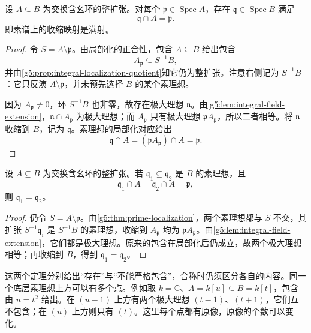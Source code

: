 \begin{theorem}
\label{g5:thm:lying-over}
	设 \(A\subseteq B\) 为交换含幺环的整扩张。对每个 \(\mathfrak p\in\operatorname{Spec}A\)，存在 \(\mathfrak q\in\operatorname{Spec}B\) 满足
	\[
		\mathfrak q\cap A=\mathfrak p.
	\]
	即素谱上的收缩映射是满射。
\end{theorem}
\begin{proof}
	令 \(S=A\setminus\mathfrak p\)。由局部化的正合性，包含 \(A\subseteq B\) 给出包含
	\[
		A_{\mathfrak p}\subseteq S^{-1}B,
	\]
	并由\cref{g5:prop:integral-localization-quotient}知它仍为整扩张。注意右侧记为 \(S^{-1}B\)：它只反演 \(A\setminus\mathfrak p\)，并未预先选择 \(B\) 的某个素理想。

	因为 \(A_{\mathfrak p}\ne0\)，环 \(S^{-1}B\) 也非零，故存在极大理想 \(\mathfrak n\)。由\cref{g5:lem:integral-field-extension}，\(\mathfrak n\cap A_{\mathfrak p}\) 为极大理想；而 \(A_{\mathfrak p}\) 只有极大理想 \(\mathfrak pA_{\mathfrak p}\)，所以二者相等。将 \(\mathfrak n\) 收缩到 \(B\)，记为 \(\mathfrak q\)。素理想的局部化对应给出
	\[
		\mathfrak q\cap A
		=(\mathfrak pA_{\mathfrak p})\cap A=\mathfrak p.
	\]
\end{proof}

\begin{theorem}[incomparability]
\label{g5:thm:incomparability}
	设 \(A\subseteq B\) 为交换含幺环的整扩张。若 \(\mathfrak q_1\subseteq\mathfrak q_2\) 是 \(B\) 的素理想，且
	\[
		\mathfrak q_1\cap A=\mathfrak q_2\cap A=\mathfrak p,
	\]
	则 \(\mathfrak q_1=\mathfrak q_2\)。
\end{theorem}
\begin{proof}
	仍令 \(S=A\setminus\mathfrak p\)。由\cref{g5:thm:prime-localization}，两个素理想都与 \(S\) 不交，其扩张 \(S^{-1}\mathfrak q_i\) 是 \(S^{-1}B\) 的素理想，收缩到 \(A_{\mathfrak p}\) 均为 \(\mathfrak pA_{\mathfrak p}\)。由\cref{g5:lem:integral-field-extension}，它们都是极大理想。原来的包含在局部化后仍成立，故两个极大理想相等；再收缩到 \(B\)，得到 \(\mathfrak q_1=\mathfrak q_2\)。
\end{proof}

这两个定理分别给出“存在”与“不能严格包含”，合称时仍须区分各自的内容。同一个底层素理想上方可以有多个点。例如取 \(k=\mathbb C\)、\(A=k[u]\subseteq B=k[t]\)，包含由 \(u=t^2\) 给出。在 \((u-1)\) 上方有两个极大理想 \((t-1)\)、\((t+1)\)，它们互不包含；在 \((u)\) 上方则只有 \((t)\)。这里每个点都有原像，原像的个数可以变化。

